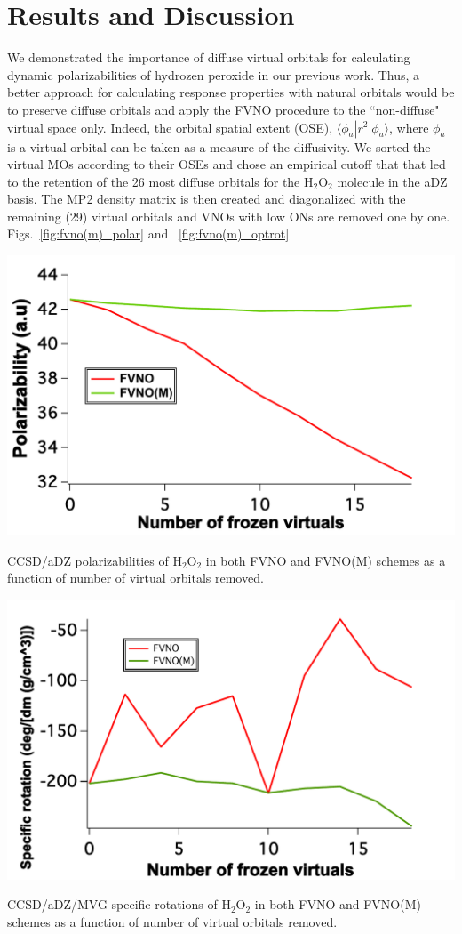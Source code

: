\section{Results and Discussion}
We demonstrated the importance of diffuse virtual orbitals for calculating  
dynamic polarizabilities of hydrozen peroxide in our previous work.
Thus, a better approach for calculating response properties with natural
orbitals would be to preserve diffuse orbitals and apply the FVNO procedure 
to the ``non-diffuse" virtual space only. Indeed, the orbital spatial extent (OSE), 
$\langle\phi_a| r^2 | \phi_a\rangle$, where $\phi_a$ is a virtual orbital
can be taken as a measure of the diffusivity. We sorted the virtual MOs 
according to their OSEs and chose an empirical cutoff that that led to the 
retention of the 26 most diffuse orbitals for the H$_2$O$_2$ molecule in the
aDZ basis. The MP2 density matrix is then created and diagonalized with the 
remaining (29) virtual orbitals and VNOs with low ONs are removed one by one.
Figs.~\ref{fig:fvno(m)_polar} and ~\ref{fig:fvno(m)_optrot}
\begin{MyFigure}[h!]
\centering
\includegraphics[width=0.6\linewidth]{figures_fvno++/fvno(m)_h2o2_adz_polar.pdf}
\caption{{\footnotesize CCSD/aDZ polarizabilities of
H$_2$O$_2$ in both FVNO and FVNO(M) schemes as a function of 
number of virtual orbitals removed.}}
\label{fig:fvno(m)_polar}
\end{MyFigure}
\begin{MyFigure}[h!]
\centering
\includegraphics[width=0.6\linewidth]{figures_fvno++/fvno(m)_h2o2_adz_optrot.pdf}
\caption{{\footnotesize CCSD/aDZ/MVG specific rotations of
H$_2$O$_2$ in both FVNO and FVNO(M) schemes as a function of 
number of virtual orbitals removed.}}
\label{fig:fvno(m)_optrot}
\end{MyFigure}
